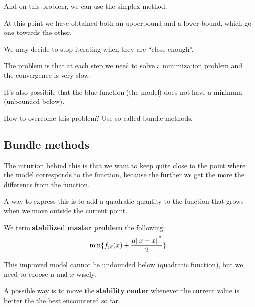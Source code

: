 \documentclass[ComputationalMathematics.tex]{subfiles}
\begin{document}
And on this problem, we can use the simplex method.


At this point we have obtained both an upperbound and a lower bound, which go one towards the other.

We may decide to stop iterating when they are ``close enough''.

The problem is that at each step we need to solve a minimization problem and the convergence is very slow.

It's also possibile that the blue function (the model) does not have a minimum (unbounded below).

How to overcome this problem? Use so-called bundle methods.

\subsection{Bundle methods}

The intuition behind this is that we want to keep quite close to the point where the model corresponds to the function, because the further we get the more the difference from the function.

A way to express this is to add a quadratic quantity to the function
that grows when we move outside the current point.

\begin{definition}
  We term \textbf{stabilized master problem} the following:
  \[
    \min \{f_{\mathscr{B}}(x) + \frac{\mu {\left\lVert x - \bar{x}\right\rVert}^2}{2} \}
  \]
\end{definition}

 This improved model cannot be undounded below (quadratic function), but we need to choose $\mu$ and $\bar{x}$ wisely.

 A possible way is to move the \textbf{stability center} whenever the current value is better the the best encountered so far.

\end{document}
